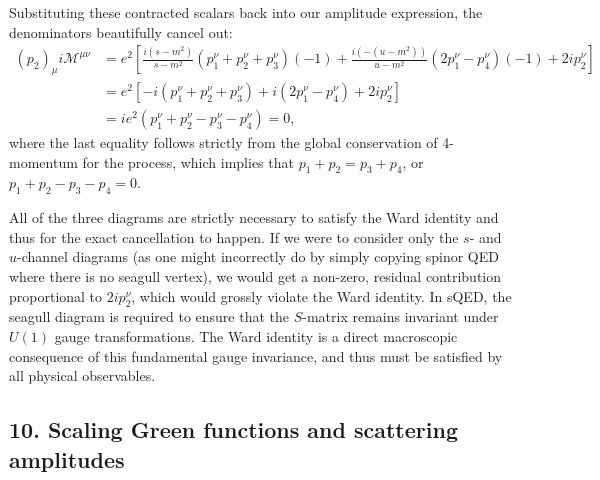 Substituting these contracted scalars back into our amplitude expression, the denominators beautifully cancel out:
\[
    \begin{aligned}
        (p_2)_\mu i \mathcal{M}^{\mu \nu} & = e^2 \left[ \frac{i(s-m^2)}{s-m^2} (p_1^{\nu} + p_2^{\nu} + p_3^{\nu})(-1) + \frac{i(-(u-m^2))}{u-m^2} (2 p_1^{\nu} - p_4^{\nu})(-1) + 2i p_2^{\nu} \right] \\
                                          & = e^2 \left[ -i (p_1^{\nu} + p_2^{\nu} + p_3^{\nu}) + i (2 p_1^{\nu} - p_4^{\nu}) + 2i p_2^{\nu} \right]                                                     \\
                                          & = ie^2 (p_1^{\nu} + p_2^{\nu} - p_3^{\nu} - p_4^{\nu}) = 0,
    \end{aligned}
\]
where the last equality follows strictly from the global conservation of 4-momentum for the process, which implies that \(p_1 + p_2 = p_3 + p_4\), or \(p_1 + p_2 - p_3 - p_4 = 0\).

\begin{remark}
    All of the three diagrams are strictly necessary to satisfy the Ward identity and thus for the exact cancellation to happen. If we were to consider only the $s$- and $u$-channel diagrams (as one might incorrectly do by simply copying spinor QED where there is no seagull vertex), we would get a non-zero, residual contribution proportional to $2i p_2^\nu$, which would grossly violate the Ward identity. In sQED, the seagull diagram is required to ensure that the $S$-matrix remains invariant under $U(1)$ gauge transformations. The Ward identity is a direct macroscopic consequence of this fundamental gauge invariance, and thus must be satisfied by all physical observables.
\end{remark}


\subsection*{10. Scaling Green functions and scattering amplitudes}

